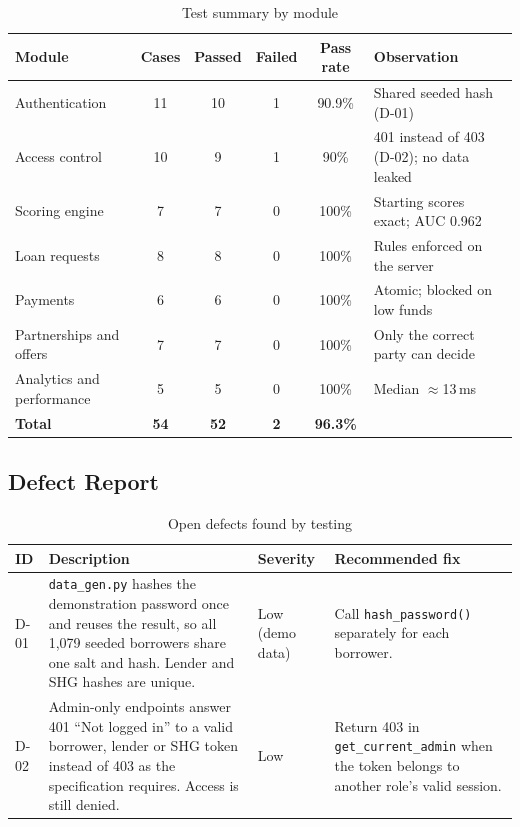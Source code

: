 \documentclass[11pt,a4paper]{article}
\newcommand{\code}[1]{\texttt{\small #1}}
\begin{document}
\begin{table}[H]
\centering
\caption{Test summary by module}
\label{tab:summary}
\small
\begin{tabular}{@{}lccccL{4.6cm}@{}}
\toprule
\textbf{Module} & \textbf{Cases} & \textbf{Passed} & \textbf{Failed} & \textbf{Pass rate} & \textbf{Observation}\\
\midrule
Authentication & 11 & 10 & 1 & 90.9\% & Shared seeded hash (D-01)\\
Access control & 10 & 9 & 1 & 90\% & 401 instead of 403 (D-02); no data leaked\\
Scoring engine & 7 & 7 & 0 & 100\% & Starting scores exact; AUC 0.962\\
Loan requests & 8 & 8 & 0 & 100\% & Rules enforced on the server\\
Payments & 6 & 6 & 0 & 100\% & Atomic; blocked on low funds\\
Partnerships and offers & 7 & 7 & 0 & 100\% & Only the correct party can decide\\
Analytics and performance & 5 & 5 & 0 & 100\% & Median $\approx$13\,ms\\
\midrule
\textbf{Total} & \textbf{54} & \textbf{52} & \textbf{2} & \textbf{96.3\%} & \\
\bottomrule
\end{tabular}
\end{table}

\subsection{Defect Report}
\begin{table}[H]
\centering
\caption{Open defects found by testing}
\label{tab:defects}
\small
\begin{tabular}{@{}lL{5.9cm}L{1.9cm}L{4.9cm}@{}}
\toprule
\textbf{ID} & \textbf{Description} & \textbf{Severity} & \textbf{Recommended fix}\\
\midrule
D-01 & \code{data\_gen.py} hashes the demonstration password once and reuses the result, so all 1{,}079 seeded borrowers share one salt and hash. Lender and SHG hashes are unique. & Low (demo data) & Call \code{hash\_password()} separately for each borrower.\\
D-02 & Admin-only endpoints answer 401 ``Not logged in'' to a valid borrower, lender or SHG token instead of 403 as the specification requires. Access is still denied. & Low & Return 403 in \code{get\_current\_admin} when the token belongs to another role's valid session.\\
\bottomrule
\end{tabular}
\end{table}
\end{document}
